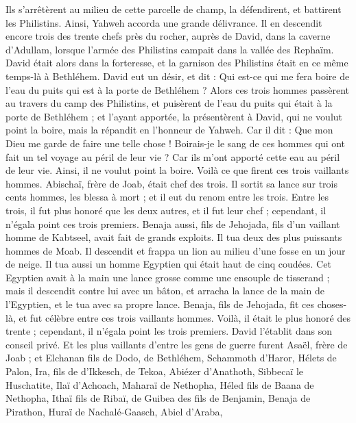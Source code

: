\begin{multicols}{2}
Ils s'arrêtèrent au milieu de cette parcelle de champ, la défendirent, et battirent les Philistins. Ainsi, Yahweh accorda une grande délivrance.
Il en descendit encore trois des trente chefs près du rocher, auprès de David, dans la caverne d'Adullam, lorsque l'armée des Philistins campait dans la vallée des Rephaïm.
David était alors dans la forteresse, et la garnison des Philistins était en ce même temps-là à Bethléhem.
David eut un désir, et dit : Qui est-ce qui me fera boire de l'eau du puits qui est à la porte de Bethléhem ?
Alors ces trois hommes passèrent au travers du camp des Philistins, et puisèrent de l'eau du puits qui était à la porte de Bethléhem ; et l'ayant apportée, la présentèrent à David, qui ne voulut point la boire, mais la répandit en l'honneur de Yahweh.
Car il dit : Que mon Dieu me garde de faire une telle chose ! Boirais-je le sang de ces hommes qui ont fait un tel voyage au péril de leur vie ? Car ils m'ont apporté cette eau au péril de leur vie. Ainsi, il ne voulut point la boire. Voilà ce que firent ces trois vaillants hommes.
Abischaï, frère de Joab, était chef des trois. Il sortit sa lance sur trois cents hommes, les blessa à mort ; et il eut du renom entre les trois.
Entre les trois, il fut plus honoré que les deux autres, et il fut leur chef ; cependant, il n'égala point ces trois premiers.
Benaja aussi, fils de Jehojada, fils d'un vaillant homme de Kabtseel, avait fait de grands exploits. Il tua deux des plus puissants hommes de Moab. Il descendit et frappa un lion au milieu d'une fosse en un jour de neige.
Il tua aussi un homme Egyptien qui était haut de cinq coudées. Cet Egyptien avait à la main une lance grosse comme une ensouple de tisserand ; mais il descendit contre lui avec un bâton, et arracha la lance de la main de l'Egyptien, et le tua avec sa propre lance.
Benaja, fils de Jehojada, fit ces choses-là, et fut célèbre entre ces trois vaillants hommes.
Voilà, il était le plus honoré des trente ; cependant, il n'égala point les trois premiers. David l'établit dans son conseil privé.
Et les plus vaillants d'entre les gens de guerre furent Asaël, frère de Joab ; et Elchanan fils de Dodo, de Bethléhem,
Schammoth d'Haror, Hélets de Palon,
Ira, fils de d'Ikkesch, de Tekoa, Abiézer d'Anathoth,
Sibbecaï le Huschatite, Ilaï d'Achoach,
Maharaï de Nethopha, Héled fils de Baana de Nethopha,
Ithaï fils de Ribaï, de Guibea des fils de Benjamin, Benaja de Pirathon,
Huraï de Nachalé-Gaasch, Abiel d'Araba,

\end{multicols}
